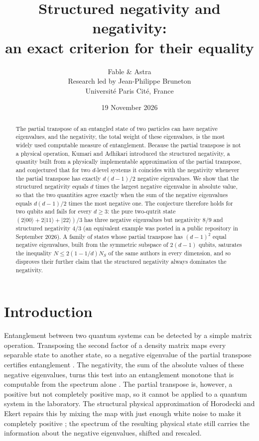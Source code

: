 \documentclass[11pt,a4paper]{article}
\title{Structured negativity and negativity:\\
an exact criterion for their equality}
\author{Fable \& Astra\\[0.35em]
\normalsize Research led by Jean-Philippe Bruneton\\[-0.1em]
\small Universit\'e Paris Cit\'e, France}
\date{19 November 2026}
\theoremstyle{definition}
\theoremstyle{plain}
\newcommand{\ket}[1]{\lvert#1\rangle}
\newcommand{\NS}{N_{S}}
\begin{document}
\maketitle
\begin{abstract}
The partial transpose of an entangled state of two particles can have negative
eigenvalues, and the negativity, the total weight of these eigenvalues, is the
most widely used computable measure of entanglement. Because the partial
transpose is not a physical operation, Kumari and Adhikari introduced the
structured negativity, a quantity built from a physically implementable
approximation of the partial transpose, and conjectured that for two
$d$-level systems it coincides with the negativity whenever the partial
transpose has exactly $d(d-1)/2$ negative eigenvalues. We show that the
structured negativity equals $d$ times the largest negative eigenvalue in
absolute value, so that the two quantities agree exactly when the sum of the
negative eigenvalues equals $d(d-1)/2$ times the most negative one. The
conjecture therefore holds for two qubits and fails for every $d\ge3$: the
pure two-qutrit state $(2\ket{00}+2\ket{11}+\ket{22})/3$ has three negative
eigenvalues but negativity $8/9$ and structured negativity $4/3$ (an
equivalent example was posted in a public repository in September 2026). A family of
states whose partial transpose has $(d-1)^2$ equal negative eigenvalues, built
from the symmetric subspace of $2(d-1)$ qubits, saturates the inequality
$N\le 2(1-1/d)\NS$ of the same authors in every dimension, and so disproves
their further claim that the structured negativity always dominates the
negativity.
\end{abstract}

\section{Introduction}
Entanglement between two quantum systems can be detected by a simple matrix
operation. Transposing the second factor of a density matrix maps every
separable state to another state, so a negative eigenvalue of the partial
transpose certifies entanglement \cite{Peres1996,Horodecki1996}. The
negativity, the sum of the absolute values of these negative eigenvalues,
turns this test into an entanglement monotone that is computable from the
spectrum alone \cite{VidalWerner2002}. The partial transpose is, however, a
positive but not completely positive map, so it cannot be applied to a
quantum system in the laboratory. The structural physical approximation of
Horodecki and Ekert repairs this by mixing the map with just enough white
noise to make it completely positive \cite{HorodeckiEkert2002}; the spectrum
of the resulting physical state still carries the information about the
negative eigenvalues, shifted and rescaled.
\end{document}
